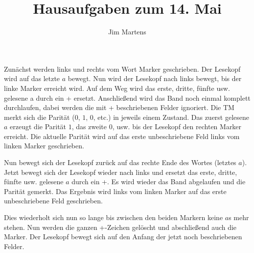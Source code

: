 \documentclass[10pt,a4paper,oneside,ngerman,numbers=noenddot]{scrartcl}
\begin{document}
\author{Jim Martens}
\title{Hausaufgaben zum 14. Mai}
\maketitle

\section{} %
\subsection{} %
Zunächst werden links und rechts vom Wort Marker geschrieben. Der Lesekopf wird auf das letzte $a$ bewegt. Nun wird der Lesekopf nach links bewegt, bis der linke Marker erreicht wird. Auf dem Weg wird das erste, dritte, fünfte usw. gelesene a durch ein + ersetzt. Anschließend wird das Band noch einmal komplett durchlaufen, dabei werden die mit + beschriebenen Felder ignoriert. Die TM merkt sich die Parität ($0$, $1$, $0$, etc.) in jeweils einem Zustand. Das zuerst gelesene $a$ erzeugt die Parität $1$, das zweite $0$, usw. bis der Lesekopf den rechten Marker erreicht. Die aktuelle Parität wird auf das erste unbeschriebene Feld links vom linken Marker geschrieben. 

Nun bewegt sich der Lesekopf zurück auf das rechte Ende des Wortes (letztes $a$). Jetzt bewegt sich der Lesekopf wieder nach links und ersetzt das erste, dritte, fünfte usw. gelesene $a$ durch ein +. Es wird wieder das Band abgelaufen und die Parität gemerkt. Das Ergebnis wird links vom linken Marker auf das erste unbeschriebene Feld geschrieben.

Dies wiederholt sich nun so lange bis zwischen den beiden Markern keine $a$s mehr stehen. Nun werden die ganzen +-Zeichen gelöscht und abschließend auch die Marker. Der Lesekopf bewegt sich auf den Anfang der jetzt noch beschriebenen Felder.
\end{document}
